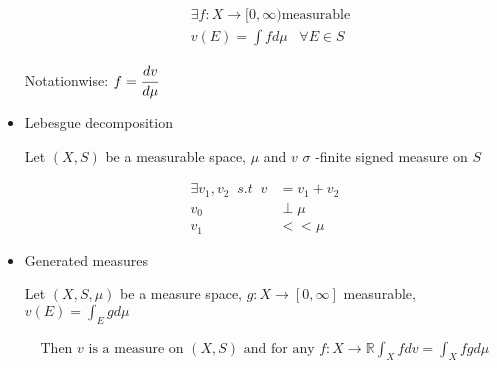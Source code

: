 \begin{itemize}
\begin{align}
&\exists f:X\rightarrow [0,\infty)\text{measurable} \\
&v(E) = \int fd\mu\;\;\; \forall E\in S
\end{align}

Notationwise: $f = \cfrac{dv}{d\mu}$

\item Lebesgue decomposition

Let $(X,S)$ be a measurable space, $\mu$ and $v$ $\sigma$ -finite signed measure on $S$

\begin{align}
\exists v_1, v_2 \;\; s.t \;\; v &= v_1 + v_2 \\
v_0 &\perp \mu \\
v_1 &<< \mu
\end{align}

\item Generated measures

Let $(X,S,\mu)$ be a measure space, $g:X\rightarrow [0,\infty]$ measurable, $v(E) = \int_E gd\mu$


\begin{align}
\text{Then $v$ is a measure on $(X, S)$ and for any $f:X\rightarrow \mathbb{R}$}
\int_X fdv = \int_X fgd\mu
\end{align}

\end{itemize}

